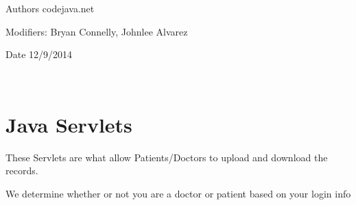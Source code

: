 \begin{DoxyAuthor}{Authors}
codejava.\+net 

 Modifiers\+: Bryan Connelly, Johnlee Alvarez 

 
\end{DoxyAuthor}
\begin{DoxyDate}{Date}
12/9/2014 

 ~\newline

\end{DoxyDate}
\hypertarget{index_intro}{}\section{Java Servlets}\label{index_intro}

\begin{DoxyItemize}
\item These Servlets are what allow Patients/\+Doctors to upload and download the records.
\item We determine whether or not you are a doctor or patient based on your login info ~\newline


 
\end{DoxyItemize}